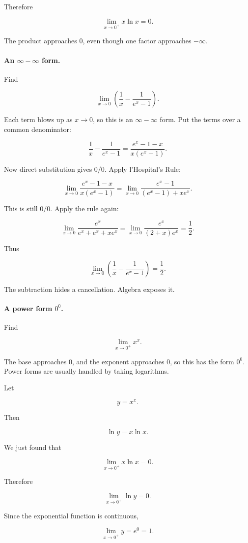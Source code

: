 Therefore

\[
\boxed{
\lim_{x\to0^+}x\ln x=0.
}
\]

The product approaches \(0\), even though one factor approaches \(-\infty\).

\paragraph{An \(\infty-\infty\) form.}
Find

\[
\lim_{x\to0}\left(\frac1x-\frac1{e^x-1}\right).
\]

Each term blows up as \(x\to0\), so this is an \(\infty-\infty\) form.  Put the terms
over a common denominator:

\[
\frac1x-\frac1{e^x-1}
=
\frac{e^x-1-x}{x(e^x-1)}.
\]

Now direct substitution gives \(0/0\).  Apply l'Hospital's Rule:

\[
\lim_{x\to0}
\frac{e^x-1-x}{x(e^x-1)}
=
\lim_{x\to0}
\frac{e^x-1}{(e^x-1)+xe^x}.
\]

This is still \(0/0\).  Apply the rule again:

\[
\lim_{x\to0}
\frac{e^x}{e^x+e^x+xe^x}
=
\lim_{x\to0}
\frac{e^x}{(2+x)e^x}
=
\frac12.
\]

Thus

\[
\boxed{
\lim_{x\to0}\left(\frac1x-\frac1{e^x-1}\right)=\frac12.
}
\]

The subtraction hides a cancellation.  Algebra exposes it.

\paragraph{A power form \(0^0\).}
Find

\[
\lim_{x\to0^+}x^x.
\]

The base approaches \(0\), and the exponent approaches \(0\), so this has the form
\(0^0\).  Power forms are usually handled by taking logarithms.

Let

\[
y=x^x.
\]

Then

\[
\ln y=x\ln x.
\]

We just found that

\[
\lim_{x\to0^+}x\ln x=0.
\]

Therefore

\[
\lim_{x\to0^+}\ln y=0.
\]

Since the exponential function is continuous,

\[
\lim_{x\to0^+}y=e^0=1.
\]

